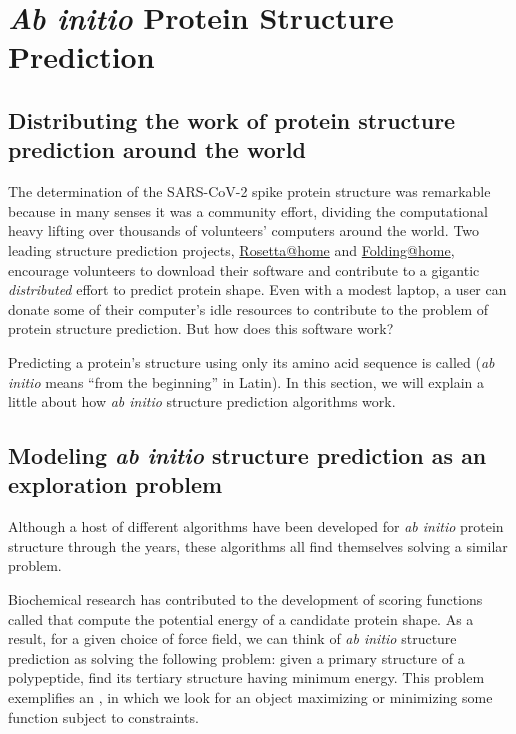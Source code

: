 \FloatBarrier
{}

\section{\textit{Ab initio} Protein Structure Prediction}
\label{sec:ab_initio}

\subsection{Distributing the work of protein structure prediction around the world}
The determination of the SARS-CoV-2 spike protein structure was remarkable because in many senses it was a community effort, dividing the computational heavy lifting over thousands of volunteers' computers around the world. Two leading structure prediction projects, \href{https://boinc.bakerlab.org}{Rosetta@home} and \href{https://foldingathome.org}{Folding@home}, encourage volunteers to download their software and contribute to a gigantic \textit{distributed} effort to predict protein shape. Even with a modest laptop, a user can donate some of their computer's idle resources to contribute to the problem of protein structure prediction. But how does this software work?

Predicting a protein’s structure using only its amino acid sequence is called  (\textit{ab initio} means “from the beginning” in Latin). In this section, we will explain a little about how \textit{ab initio} structure prediction algorithms work.

\FloatBarrier
{}
\subsection{Modeling \textit{ab initio} structure prediction as an exploration problem}

Although a host of different algorithms have been developed for \textit{ab initio} protein structure through the years, these algorithms all find themselves solving a similar problem.

Biochemical research has contributed to the development of scoring functions called  that compute the potential energy of a candidate protein shape. As a result, for a given choice of force field, we can think of \textit{ab initio} structure prediction as solving the following problem: given a primary structure of a polypeptide, find its tertiary structure having minimum energy. This problem exemplifies an , in which we look for an object maximizing or minimizing some function subject to constraints.

